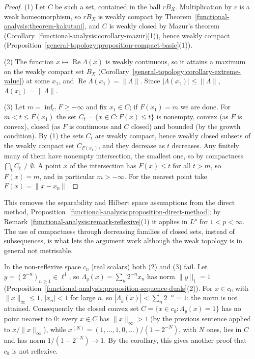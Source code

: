 \begin{proof}
(1) Let $C$ be such a set, contained in the ball $rB_X$. Multiplication by $r$ is a weak homeomorphism, so $rB_X$ is weakly compact by Theorem~\ref{functional-analysis:theorem-kakutani}, and $C$ is weakly
closed by Mazur's theorem (Corollary~\ref{functional-analysis:corollary-mazur}(1)), hence weakly compact (Proposition~\ref{general-topology:proposition-compact-basic}(1)).

(2) The function $x \mapsto \operatorname{Re}\Lambda(x)$ is weakly continuous, so it attains a maximum on the weakly compact set $B_X$ (Corollary~\ref{general-topology:corollary-extreme-value}) at some $x_1$, and
$\operatorname{Re}\Lambda(x_1) = \|\Lambda\|$. Since $|\Lambda(x_1)| \leq \|\Lambda\|$, $\Lambda(x_1) = \|\Lambda\|$.

(3) Let $m = \inf_CF \geq -\infty$ and fix $x_1 \in C$; if $F(x_1) = m$ we are done. For $m < t \leq F(x_1)$ the set $C_t = \{x \in C : F(x) \leq t\}$ is nonempty, convex (as $F$ is convex), closed (as $F$ is
continuous and $C$ closed) and bounded (by the growth condition). By (1) the sets $C_t$ are weakly compact, hence weakly closed subsets of the weakly compact set $C_{F(x_1)}$, and they decrease as
$t$ decreases. Any finitely many of them have nonempty intersection, the smallest one, so by compactness $\bigcap_tC_t \neq \emptyset$. A point $x$ of the intersection has $F(x) \leq t$ for all $t > m$, so
$F(x) = m$, and in particular $m > -\infty$. For the nearest point take $F(x) = \|x - x_0\|$.
\end{proof}

This removes the separability and Hilbert space assumptions from the direct method, Proposition~\ref{functional-analysis:proposition-direct-method}; by
Remark~\ref{functional-analysis:remark-reflexive}(1) it applies in $L^p$ for $1 < p < \infty$. The use of compactness through decreasing families of closed sets, instead of subsequences, is what lets the
argument work although the weak topology is in general not metrisable.

\begin{counterexample}\label{functional-analysis:counterexample-c0-nearest}
In the non-reflexive space $c_0$ (real scalars) both (2) and (3) fail. Let $y = (2^{-n})_{n \geq 1} \in \ell^1$, so $\Lambda_y(x) = \sum_n2^{-n}x_n$ has norm $\|y\|_1 = 1$
(Proposition~\ref{functional-analysis:proposition-sequence-duals}(2)). For $x \in c_0$ with $\|x\|_\infty \leq 1$, $|x_n| < 1$ for large $n$, so $|\Lambda_y(x)| < \sum_n2^{-n} = 1$: the norm is not attained. Consequently the
closed convex set $C = \{x \in c_0 : \Lambda_y(x) = 1\}$ has no point nearest to $0$: every $x \in C$ has $\|x\|_\infty > 1$ (by the previous sentence applied to $x/\|x\|_\infty$), while
$x^{(N)} = (1, \ldots, 1, 0, \ldots)/(1 - 2^{-N})$, with $N$ ones, lies in $C$ and has norm $1/(1 - 2^{-N}) \to 1$. By the corollary, this gives another proof that $c_0$ is not reflexive.
\end{counterexample}

